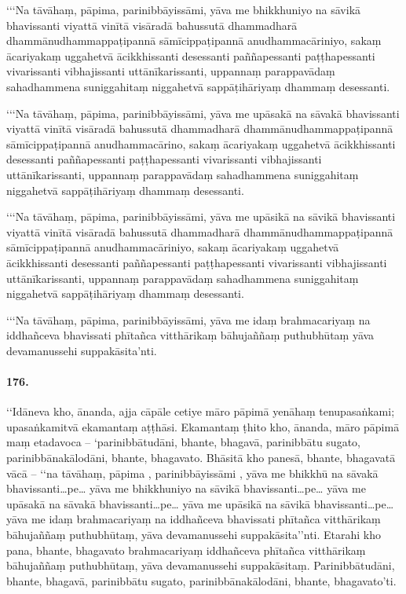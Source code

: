 ‘‘‘Na tāvāhaṃ, pāpima, parinibbāyissāmi, yāva me bhikkhuniyo na sāvikā bhavissanti viyattā vinītā visāradā bahussutā dhammadharā dhammānudhammappaṭipannā sāmīcippaṭipannā anudhammacāriniyo, sakaṃ ācariyakaṃ uggahetvā ācikkhissanti desessanti paññapessanti paṭṭhapessanti vivarissanti vibhajissanti uttānīkarissanti, uppannaṃ parappavādaṃ sahadhammena suniggahitaṃ niggahetvā sappāṭihāriyaṃ dhammaṃ desessanti.

‘‘‘Na tāvāhaṃ, pāpima, parinibbāyissāmi, yāva me upāsakā na sāvakā bhavissanti viyattā vinītā visāradā bahussutā dhammadharā dhammānudhammappaṭipannā sāmīcippaṭipannā anudhammacārino, sakaṃ ācariyakaṃ uggahetvā ācikkhissanti desessanti paññapessanti paṭṭhapessanti vivarissanti vibhajissanti uttānīkarissanti, uppannaṃ parappavādaṃ sahadhammena suniggahitaṃ niggahetvā sappāṭihāriyaṃ dhammaṃ desessanti.

‘‘‘Na tāvāhaṃ, pāpima, parinibbāyissāmi, yāva me upāsikā na sāvikā bhavissanti viyattā vinītā visāradā bahussutā dhammadharā dhammānudhammappaṭipannā sāmīcippaṭipannā anudhammacāriniyo, sakaṃ ācariyakaṃ uggahetvā ācikkhissanti desessanti paññapessanti paṭṭhapessanti vivarissanti vibhajissanti uttānīkarissanti, uppannaṃ parappavādaṃ sahadhammena suniggahitaṃ niggahetvā sappāṭihāriyaṃ dhammaṃ desessanti.

‘‘‘Na tāvāhaṃ, pāpima, parinibbāyissāmi, yāva me idaṃ brahmacariyaṃ na iddhañceva bhavissati phītañca vitthārikaṃ bāhujaññaṃ puthubhūtaṃ yāva devamanussehi suppakāsita’nti.

\paragraph{176.} ‘‘Idāneva kho, ānanda, ajja cāpāle cetiye māro pāpimā yenāhaṃ tenupasaṅkami; upasaṅkamitvā ekamantaṃ aṭṭhāsi. Ekamantaṃ ṭhito kho, ānanda, māro pāpimā maṃ etadavoca – ‘parinibbātudāni, bhante, bhagavā, parinibbātu sugato, parinibbānakālodāni, bhante, bhagavato. Bhāsitā kho panesā, bhante, bhagavatā vācā – ‘‘na tāvāhaṃ, pāpima , parinibbāyissāmi , yāva me bhikkhū na sāvakā bhavissanti…pe… yāva me bhikkhuniyo na sāvikā bhavissanti…pe… yāva me upāsakā na sāvakā bhavissanti…pe… yāva me upāsikā na sāvikā bhavissanti…pe… yāva me idaṃ brahmacariyaṃ na iddhañceva bhavissati phītañca vitthārikaṃ bāhujaññaṃ puthubhūtaṃ, yāva devamanussehi suppakāsita’’nti. Etarahi kho pana, bhante, bhagavato brahmacariyaṃ iddhañceva phītañca vitthārikaṃ bāhujaññaṃ puthubhūtaṃ, yāva devamanussehi suppakāsitaṃ. Parinibbātudāni, bhante, bhagavā, parinibbātu sugato, parinibbānakālodāni, bhante, bhagavato’ti.


